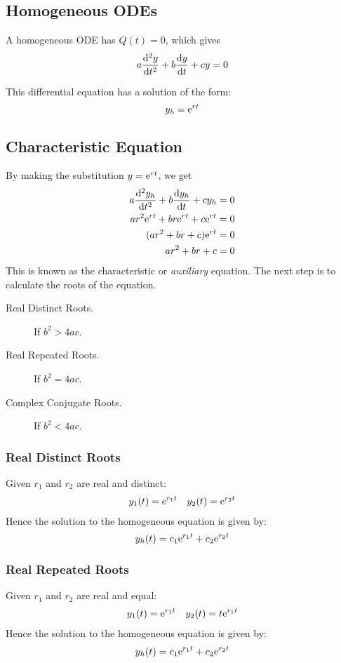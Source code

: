 \documentclass{article}
\begin{document}
\subsection{Homogeneous ODEs}
\begin{definition}
    A homogeneous ODE has $Q(t)=0$, which gives
    \begin{equation*}
        a \dv[2]{y}{t} + b \dv{y}{t} + c y = 0
    \end{equation*} 
\end{definition}
This differential equation has a solution of the form:
\begin{equation*}
    y_h = \mathrm{e}^{rt}
\end{equation*}
\subsection{Characteristic Equation}
By making the substitution $y=\mathrm{e}^{rt}$, we get
\begin{align*}
    a \dv[2]{y_h}{t} + b \dv{y_h}{t} + c y_h &= 0 \\
    ar^2\mathrm{e}^{rt} + br\mathrm{e}^{rt} + c\mathrm{e}^{rt} &= 0 \\
    (ar^2 + br + c)\mathrm{e}^{rt} &= 0 \\
    ar^2 + br + c &= 0
\end{align*}
This is known as the characteristic or \textit{auxiliary} equation. The next step is to calculate the roots of the equation.
\begin{description}
    \item[Real Distinct Roots.] If $b^2 > 4ac$.
    \item[Real Repeated Roots.] If $b^2 = 4ac$.
    \item[Complex Conjugate Roots.] If $b^2 < 4ac$.
\end{description}
\subsubsection{Real Distinct Roots}
Given $r_1$ and $r_2$ are real and distinct:
\begin{align*}
    y_1(t) = \mathrm{e}^{r_1t} & & y_2(t) = \mathrm{e}^{r_2t}
\end{align*}
Hence the solution to the homogeneous equation is given by:
\begin{equation*}
    y_h(t) = c_1\mathrm{e}^{r_1t} + c_2\mathrm{e}^{r_2t}
\end{equation*}
\subsubsection{Real Repeated Roots}
Given $r_1$ and $r_2$ are real and equal:
\begin{align*}
    y_1(t) = \mathrm{e}^{r_1t} & & y_2(t) = t\mathrm{e}^{r_1t}
\end{align*}
Hence the solution to the homogeneous equation is given by:
\begin{equation*}
    y_h(t) = c_1\mathrm{e}^{r_1t} + c_2\mathrm{e}^{r_2t}
\end{equation*}
\end{document}
